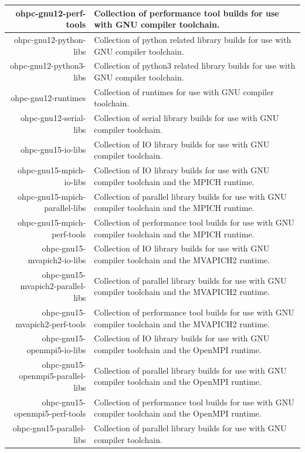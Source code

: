 \begin{tabularx}{\textwidth}{r|X}
\hline
ohpc-gnu12-perf-tools & Collection of performance tool builds for use with GNU compiler toolchain. \\ 
\hline
ohpc-gnu12-python-libs & Collection of python related library builds for use with GNU compiler toolchain. \\ 
\hline
ohpc-gnu12-python3-libs & Collection of python3 related library builds for use with GNU compiler toolchain. \\ 
\hline
ohpc-gnu12-runtimes & Collection of runtimes for use with GNU compiler toolchain. \\ 
\hline
ohpc-gnu12-serial-libs & Collection of serial library builds for use with GNU compiler toolchain. \\ 
\hline
ohpc-gnu15-io-libs & Collection of IO library builds for use with GNU compiler toolchain. \\ 
\hline
ohpc-gnu15-mpich-io-libs & Collection of IO library builds for use with GNU compiler toolchain and the MPICH runtime. \\ 
\hline
ohpc-gnu15-mpich-parallel-libs & Collection of parallel library builds for use with GNU compiler toolchain and the MPICH runtime. \\ 
\hline
ohpc-gnu15-mpich-perf-tools & Collection of performance tool builds for use with GNU compiler toolchain and the MPICH runtime. \\ 
\hline
ohpc-gnu15-mvapich2-io-libs & Collection of IO library builds for use with GNU compiler toolchain and the MVAPICH2 runtime. \\ 
\hline
ohpc-gnu15-mvapich2-parallel-libs & Collection of parallel library builds for use with GNU compiler toolchain and the MVAPICH2 runtime. \\ 
\hline
ohpc-gnu15-mvapich2-perf-tools & Collection of performance tool builds for use with GNU compiler toolchain and the MVAPICH2 runtime. \\ 
\hline
ohpc-gnu15-openmpi5-io-libs & Collection of IO library builds for use with GNU compiler toolchain and the OpenMPI runtime. \\ 
\hline
ohpc-gnu15-openmpi5-parallel-libs & Collection of parallel library builds for use with GNU compiler toolchain and the OpenMPI runtime. \\ 
\hline
ohpc-gnu15-openmpi5-perf-tools & Collection of performance tool builds for use with GNU compiler toolchain and the OpenMPI runtime. \\ 
\hline
ohpc-gnu15-parallel-libs & Collection of parallel library builds for use with GNU compiler toolchain. \\ 

\end{tabularx}
